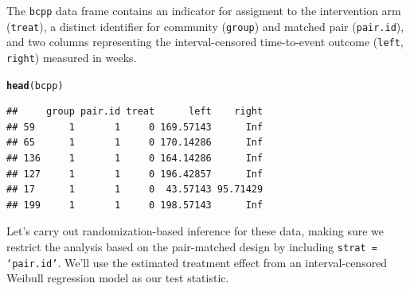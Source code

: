 \documentclass[12pt]{article}\usepackage[]{graphicx}\usepackage[]{color}
\makeatletter
\newcommand{\hlstd}[1]{\textcolor[rgb]{0.345,0.345,0.345}{#1}}%
\newcommand{\hlkwd}[1]{\textcolor[rgb]{0.737,0.353,0.396}{\textbf{#1}}}%
\newenvironment{kframe}{%
 \def\at@end@of@kframe{}%
 \ifinner\ifhmode%
  \def\at@end@of@kframe{\end{minipage}}%
  \begin{minipage}{\columnwidth}%
 \fi\fi%
 \def\FrameCommand##1{\hskip\@totalleftmargin \hskip-\fboxsep
 \colorbox{shadecolor}{##1}\hskip-\fboxsep
     \hskip-\linewidth \hskip-\@totalleftmargin \hskip\columnwidth}%
 \MakeFramed {\advance\hsize-\width
   \@totalleftmargin\z@ \linewidth\hsize
   \@setminipage}}%
 {\par\unskip\endMakeFramed%
 \at@end@of@kframe}
\newenvironment{knitrout}{}{} %
\makeatother
\begin{document}
The \texttt{bcpp} data frame contains an indicator for assigment to the intervention arm (\texttt{treat}), a distinct identifier for community (\texttt{group}) and matched pair (\texttt{pair.id}), and two columns representing the interval-censored time-to-event outcome (\texttt{left}, \texttt{right}) measured in weeks.
\begin{knitrout}
\color{fgcolor}\begin{kframe}
\begin{alltt}
\hlkwd{head}\hlstd{(bcpp)}
\end{alltt}
\begin{verbatim}
##     group pair.id treat      left    right
## 59      1       1     0 169.57143      Inf
## 65      1       1     0 170.14286      Inf
## 136     1       1     0 164.14286      Inf
## 127     1       1     0 196.42857      Inf
## 17      1       1     0  43.57143 95.71429
## 199     1       1     0 198.57143      Inf
\end{verbatim}
\end{kframe}
\end{knitrout}
Let's carry out randomization-based inference for these data, making sure we restrict the analysis based on the pair-matched design by including \texttt{strat = `pair.id'}. We'll use the estimated treatment effect from an interval-censored Weibull regression model as our test statistic.
\end{document}

